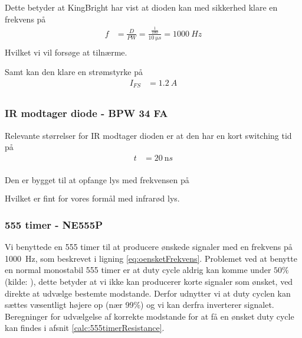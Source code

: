 Dette betyder at KingBright har vist at dioden kan med sikkerhed klare en frekvens på
\begin{align}
	f &=  \frac{D}{PW} =  \frac{\frac{1}{100}}{\SI{10}{\micro s}} = \SI{1000}{Hz}\label{eq:oensketFrekvens}\\ 
\end{align}
Hvilket vi vil forsøge at tilnærme.

Samt kan den klare en strømstyrke på 
\begin{align}
	I_{FS} &= \SI{1.2}{A} \\
\end{align}

\subsubsection{IR modtager diode - BPW 34 FA}
Relevante størrelser for IR modtager dioden \cite{kompIRmodtager} er at den har en kort switching tid på
\begin{align}
	t &= \SI{20}{\nano s} \\
\end{align}

Den er bygget til at opfange lys med frekvensen på
\begin{align}
	 [\SI{730}{nm};\SI{1100}{nm}] \\
\end{align}
Hvilket er fint for vores formål med infrarød lys.
\subsubsection{555 timer - NE555P}
Vi benyttede en 555 timer\cite{komp555} til at producere ønskede signaler med en frekvens på \SI{1000}{Hz}, som beskrevet i ligning \ref{eq:oensketFrekvens}.
Problemet ved at benytte en normal monostabil 555 timer er at duty cycle aldrig kan komme under $50\%$ (kilde: \cite{555timer50percent}), dette betyder at vi ikke kan producerer korte signaler som ønsket, ved direkte at udvælge bestemte modstande. Derfor udnytter vi at duty cyclen kan sættes væsentligt højere op (nær 99\%) og vi kan derfra inverterer signalet. Beregninger for udvælgelse af korrekte modstande for at få en ønsket duty cycle kan findes i afsnit \ref{calc:555timerResistance}.

